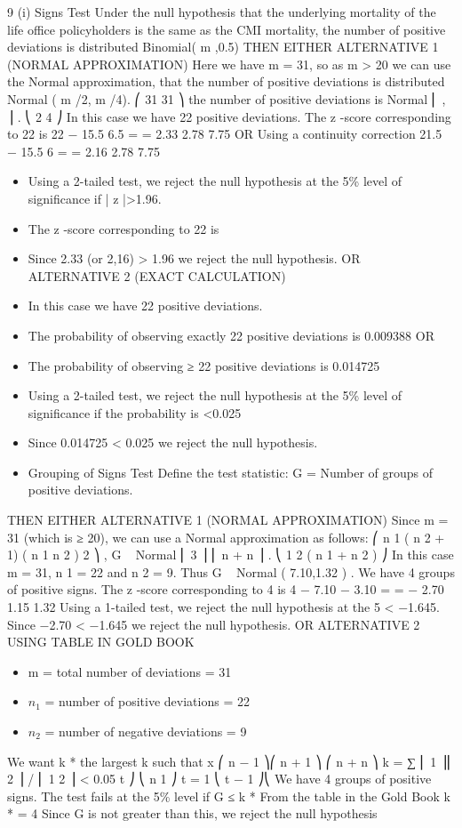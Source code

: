 \documentclass[a4paper,12pt]{article}
\begin{document}
\begin{enumerate}
\begin{enumerate}[(i)]
9
(i)
Signs Test
Under the null hypothesis that the underlying mortality of the life office policyholders
is the same as the CMI mortality,
the number of positive deviations is distributed Binomial( m ,0.5)
THEN EITHER ALTERNATIVE 1 (NORMAL APPROXIMATION)
Here we have m = 31, so as m > 20 we can use the Normal approximation, that the
number of positive deviations is distributed Normal ( m /2, m /4).
⎛ 31 31 ⎞
the number of positive deviations is Normal ⎜ , ⎟ .
⎝ 2 4 ⎠
In this case we have 22 positive deviations.
The z -score corresponding to 22 is
22 − 15.5 6.5
=
= 2.33
2.78
7.75
OR Using a continuity correction
21.5 − 15.5
6
=
= 2.16
2.78
7.75
\begin{itemize}
\item Using a 2-tailed test, we reject the null hypothesis at the 5\% level of
significance if | z |>1.96.
\item The z -score corresponding to 22 is
\item Since 2.33 (or 2,16) > 1.96 we reject the null hypothesis.
OR ALTERNATIVE 2 (EXACT CALCULATION)
\item In this case we have 22 positive deviations.
\item The probability of observing exactly 22 positive deviations is 0.009388
OR
\item The probability of observing ≥ 22 positive deviations is 0.014725
\item Using a 2-tailed test, we reject the null hypothesis at the 5\% level of significance if the probability is <0.025
\item Since 0.014725 < 0.025 we reject the null hypothesis.
\item Grouping of Signs Test
Define the test statistic:
G = Number of groups of positive deviations.
\end{itemize}
THEN EITHER ALTERNATIVE 1 (NORMAL APPROXIMATION)
Since m = 31 (which is ≥ 20), we can use a Normal approximation as follows:
⎛ n 1 ( n 2 + 1) ( n 1 n 2 ) 2 ⎞
,
G ~ Normal ⎜
3 ⎟
⎜ n + n
⎟ .
⎝ 1 2 ( n 1 + n 2 ) ⎠
In this case m = 31, n 1 = 22 and n 2 = 9.
Thus G ~ Normal ( 7.10,1.32 ) .
We have 4 groups of positive signs.
The z -score corresponding to 4 is
4 − 7.10 − 3.10
=
= − 2.70
1.15
1.32
Using a 1-tailed test, we reject the null hypothesis at the 5%
< −1.645.
Since −2.70 < −1.645 we reject the null hypothesis.
OR ALTERNATIVE 2 USING TABLE IN GOLD BOOK
\begin{itemize}
\item m = total number of deviations = 31
\item $n_1$ = number of positive deviations = 22
\item $n_2$ = number of negative deviations = 9
\end{itemize}
We want k * the largest k such that
x
⎛ n − 1 ⎞⎛ n + 1 ⎞ ⎛ n + n ⎞
k = ∑ ⎜ 1 ⎟⎜ 2 ⎟ / ⎜ 1 2 ⎟ < 0.05
t ⎠ ⎝ n 1 ⎠
t = 1 ⎝ t − 1 ⎠⎝
We have 4 groups of positive signs.
The test fails at the 5\% level if G ≤ k *
From the table in the Gold Book k * = 4
Since G is not greater than this, we reject the null hypothesis


\end{enumerate}
\end{enumerate}
\end{document}
